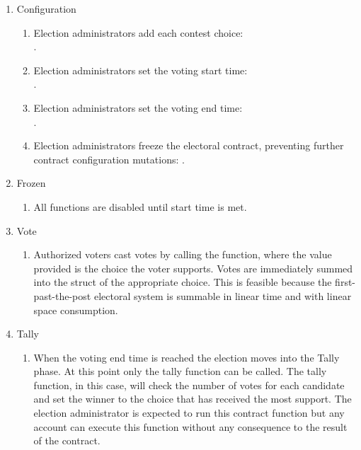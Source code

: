 \begin{enumerate}
  \item Configuration
  \begin{enumerate}
    \item Election administrators add each contest choice: \\
      .
    \item Election administrators set the voting start time: \\
      .
    \item Election administrators set the voting end time: \\
      .
    \item Election administrators freeze the electoral contract, preventing
      further contract configuration mutations: .
  \end{enumerate}

  \item Frozen
  \begin{enumerate}
    \item All functions are disabled until start time is met.
  \end{enumerate}

  \item Vote
  \begin{enumerate}
    \item Authorized voters cast votes by calling the 
      function, where the value provided is the choice the voter supports.
      Votes are immediately summed into the struct of the appropriate choice.
      This is feasible because the first-past-the-post electoral system is
      summable in linear time and with linear space consumption.
  \end{enumerate}

  \item Tally
  \begin{enumerate}
    \item When the voting end time is reached the election moves into the
      Tally phase. At this point only the tally function can be called.
      The tally function, in this case, will check the number of votes for
      each candidate and set the winner to the choice that has received
      the most support. The election administrator is expected to run this
      contract function but any account can execute this function without
      any consequence to the result of the contract.
  \end{enumerate}
\end{enumerate}

